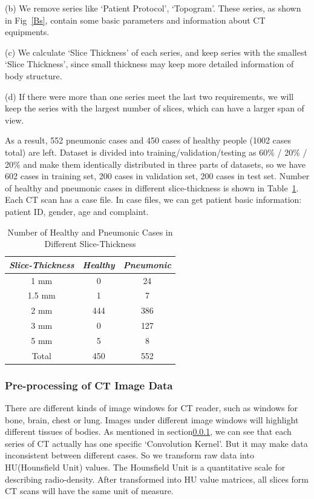 \documentclass[journal]{IEEEtran}
\begin{document}
(b) We remove series like `Patient Protocol', `Topogram'. These series, as shown in Fig~\ref{Bs}, contain some basic parameters and information about CT equipments.

(c) We calculate `Slice Thickness' of each series, and keep series with the smallest `Slice Thickness', since small thickness may keep more detailed information of body structure. 

(d) If there were more than one series meet the last two requirements, we will keep the series with the largest number of slices, which can have a larger span of view.

As a result, 552 pneumonic cases and 450 cases of healthy people (1002 cases total) are left.
Dataset is divided into training/validation/testing as 60\% / 20\% / 20\% and make them identically distributed in three parts of datasets, so we have 602 cases in training set, 200 cases in validation set, 200 cases in test set.
Number of healthy and pneumonic cases in different slice-thickness is shown in Table~\ref{distributionofhealthyandpneumonic}.
Each CT scan has a case file. In case files, we can get patient basic information: patient ID, gender, age and complaint. 

\begin{table}[htb]
\vspace{-0cm}
\caption{Number of Healthy and Pneumonic Cases in Different Slice-Thickness}
\vspace{-0cm}
\begin{center}
\begin{tabular}{|c|c|c|}
\hline
\textbf{\textit{Slice-Thickness}}& \textbf{\textit{Healthy}}& \textbf{\textit{Pneumonic}}  \\
\hline
1 mm & 0 & 24 \\
1.5 mm  & 1 & 7\\
2 mm & 444 & 386  \\
3 mm & 0 & 127  \\
5 mm & 5 & 8  \\
\hline
Total & 450 & 552 \\
\hline
\end{tabular}
\vspace{-0cm}
\label{distributionofhealthyandpneumonic}
\end{center}
\vspace{-0cm}
\end{table}

\subsubsection{Pre-processing of CT Image Data}
\label{ctimagedata}
There are different kinds of image windows for CT reader, such as windows for bone, brain, chest or lung. Images under different image windows will highlight different tissues of bodies.
As mentioned in section\ref{ctimagedata}, we can see that each series of CT actually has one specific `Convolution Kernel'. But it may make data inconsistent between different cases. So we transform raw data into HU(Hounsfield Unit) values. The Hounsfield Unit is a quantitative scale for describing radio-density. After transformed into HU value matrices, all slices form CT scans will have the same unit of measure.
\end{document}
